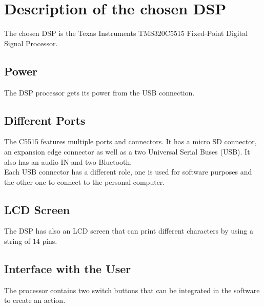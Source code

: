 \section{Description of the chosen DSP}

The chosen DSP is the Texas Instruments TMS320C5515 Fixed-Point Digital Signal Processor.

\subsection{Power}

The DSP processor gets its power from the USB connection.

\subsection{Different Ports}

The C5515 features multiple ports and connectors. It has a micro SD connector, an expansion edge connector as well as a two Universal Serial Buses (USB). It also has an audio IN and two Bluetooth. \\

Each USB connector has a different role, one is used for software purposes and the other one to connect to the personal computer. 

\subsection{LCD Screen}

The DSP has also an LCD screen that can print different characters by using a string of 14 pins. 

\subsection{Interface with the User}

The processor contains two switch buttons that can be integrated in the software to create an action. 